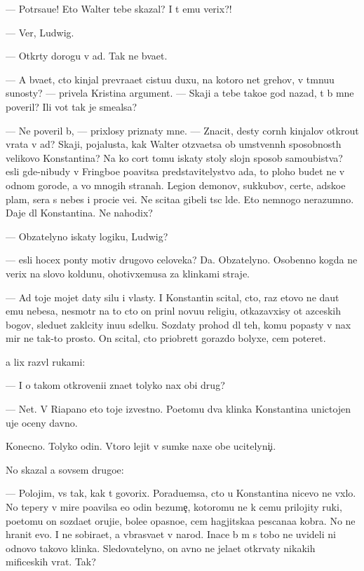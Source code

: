 \documentclass[10pt]{book}
\begin{document}
— Potr{\ia}sa{\y}u{\x}e! Eto Walter tebe skazal? I t{\yi} {\y}emu verix?!

— Ver{\iu}, Ludwig.

— Otkr{\yi}ty dorogu v ad. Tak ne b{\yi}va{\y}et.

— A b{\yi}va{\y}et, cto kinjal prevra{\x}a{\y}et cistu{\y}u duxu, na kotoro{\y} net grehov, v t{\e}mnu{\y}u su{\x}nosty? — privela Kristina argument. — Skaji {\y}a tebe tako{\y}e god nazad, t{\yi} b{\yi} mne poveril? Ili vot tak je sme{\y}alsa?

— Ne poveril b{\yi}, — prixlosy priznaty mne. — Znacit, des{\ia}ty corn{\yi}h kinjalov otkro{\y}ut vrata v ad? Skaji, pojalu{\y}sta, kak Walter otz{\yi}va{\y}etsa ob umstvenn{\yi}h sposobnost{\ia}h velikovo Konstantina? Na ko{\y} cort tomu iskaty stoly slojn{\yi}{\y} sposob samoubi{\y}stva? {\Y}esli gde-nibudy v Fringboe po{\y}avitsa predstavitelystvo ada, to ploho budet ne v odnom gorode, a vo mnogih stranah. Legion{\yi} demonov, sukkubov, certe{\y}, adsko{\y}e plam{\ia}, sera s nebes i proci{\y}e ve{\x}i. Ne scita{\y}a gibeli t{\yi}s{\ia}c l{\iu}de{\y}. Eto nemnogo nerazumno. Daje dl{\ia} Konstantina. Ne nahodix?

— Ob{\ia}zatelyno iskaty logiku, Ludwig?

— {\Y}esli hocex pon{\ia}ty motiv{\yi} drugovo celoveka? Da. Ob{\ia}zatelyno. Osobenno kogda ne verix na slovo koldunu, ohotivxemusa za klinkami straje{\y}.

— Ad toje mojet daty silu i vlasty. I Konstantin scital, cto, raz etovo ne da{\y}ut {\y}emu nebesa, nesmotr{\ia} na to cto on prin{\ia}l novu{\y}u religi{\y}u, otkazavxisy ot {\y}az{\yi}ceskih bogov, sledu{\y}et zakl{\iu}city inu{\y}u sdelku. Sozdaty prohod dl{\ia} teh, komu popasty v nax mir ne tak-to prosto. On scital, cto priobret{\e}t gorazdo bolyxe, cem poter{\ia}{\y}et.

{\Y}a lix razv{\e}l rukami:

— I o takom otkroveni{\y}i zna{\y}et tolyko nax ob{\x}i{\y} drug?

— Net. V Riapano eto toje izvestno. Poetomu dva klinka Konstantina unictojen{\yi} uje oceny davno.

Konecno. Tolyko odin. Vtoro{\y} lejit v sumke naxe{\y} ob{\x}e{\y} ucitelyni{\c}i.

No skazal {\y}a sovsem drugo{\y}e:

— Polojim, vs{\e} tak, kak t{\yi} govorix. Poradu{\y}emsa, cto u Konstantina nicevo ne v{\yi}xlo. No tepery v mire po{\y}avilsa {\y}e{\x}o odin bezume{\c}, kotoromu ne k cemu prilojity ruki, poetomu on sozda{\y}et oruji{\y}e, bole{\y}e opasno{\y}e, cem hagjitska{\y}a pescana{\y}a kobra. No ne hranit {\y}evo. I ne sobira{\y}et, a v{\yi}bras{\yi}va{\y}et v narod. Inace b{\yi} m{\yi} s tobo{\y} ne uvideli ni odnovo takovo klinka. Sledovatelyno, on {\y}avno ne jela{\y}et otkr{\yi}vaty nikakih mificeskih vrat. Tak?
\end{document}
